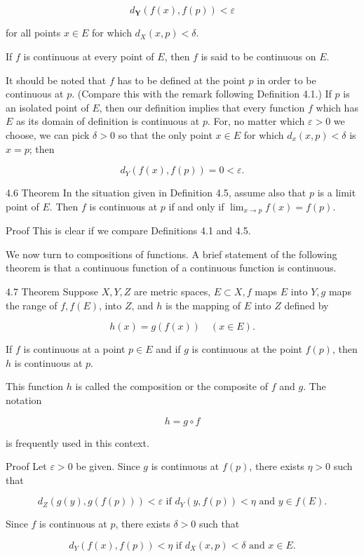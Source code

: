 \documentclass[10pt]{article}
\begin{document}
$$
d_{\mathbf{Y}}(f(x), f(p))<\varepsilon
$$

for all points $x \in E$ for which $d_{X}(x, p)<\delta$.

If $f$ is continuous at every point of $E$, then $f$ is said to be continuous on $E$.

It should be noted that $f$ has to be defined at the point $p$ in order to be continuous at $p$. (Compare this with the remark following Definition 4.1.) If $p$ is an isolated point of $E$, then our definition implies that every function $f$ which has $E$ as its domain of definition is continuous at $p$. For, no matter which $\varepsilon>0$ we choose, we can pick $\delta>0$ so that the only point $x \in E$ for which $d_{x}(x, p)<\delta$ is $x=p$; then

$$
d_{Y}(f(x), f(p))=0<\varepsilon .
$$

4.6 Theorem In the situation given in Definition 4.5, assume also that $p$ is a limit point of $E$. Then $f$ is continuous at $p$ if and only if $\lim _{x \rightarrow p} f(x)=f(p)$.

Proof This is clear if we compare Definitions 4.1 and 4.5.

We now turn to compositions of functions. A brief statement of the following theorem is that a continuous function of a continuous function is continuous.

4.7 Theorem Suppose $X, Y, Z$ are metric spaces, $E \subset X, f$ maps $E$ into $Y, g$ maps the range of $f, f(E)$, into $Z$, and $h$ is the mapping of $E$ into $Z$ defined by

$$
h(x)=g(f(x)) \quad(x \in E) .
$$

If $f$ is continuous at a point $p \in E$ and if $g$ is continuous at the point $f(p)$, then $h$ is continuous at $p$.

This function $h$ is called the composition or the composite of $f$ and $g$. The notation

$$
h=g \circ f
$$

is frequently used in this context.

Proof Let $\varepsilon>0$ be given. Since $g$ is continuous at $f(p)$, there exists $\eta>0$ such that

$$
d_{Z}(g(y), g(f(p)))<\varepsilon \text { if } d_{Y}(y, f(p))<\eta \text { and } y \in f(E) .
$$

Since $f$ is continuous at $p$, there exists $\delta>0$ such that

$$
d_{Y}(f(x), f(p))<\eta \text { if } d_{X}(x, p)<\delta \text { and } x \in E .
$$
\end{document}

